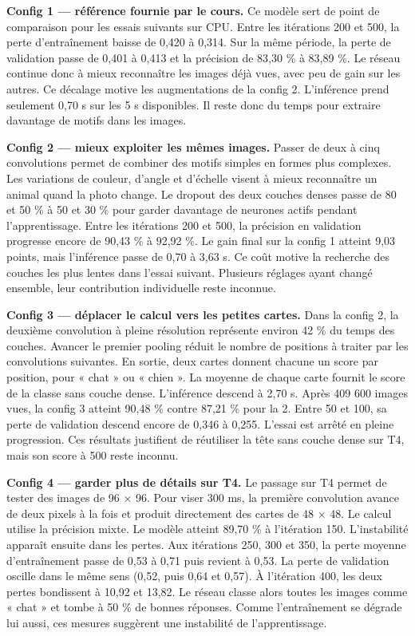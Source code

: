 \documentclass[10pt,a4paper]{article}
\begin{document}
\textbf{Config 1 — référence fournie par le cours.} Ce modèle sert de point de comparaison pour les essais suivants sur CPU. Entre les itérations 200 et 500, la perte d’entraînement baisse de 0,420 à 0,314. Sur la même période, la perte de validation passe de 0,401 à 0,413 et la précision de 83,30 \% à 83,89 \%. Le réseau continue donc à mieux reconnaître les images déjà vues, avec peu de gain sur les autres. Ce décalage motive les augmentations de la config 2. L’inférence prend seulement 0,70 s sur les 5 s disponibles. Il reste donc du temps pour extraire davantage de motifs dans les images.

\textbf{Config 2 — mieux exploiter les mêmes images.} Passer de deux à cinq convolutions permet de combiner des motifs simples en formes plus complexes. Les variations de couleur, d’angle et d’échelle visent à mieux reconnaître un animal quand la photo change. Le dropout des deux couches denses passe de 80 et 50 \% à 50 et 30 \% pour garder davantage de neurones actifs pendant l’apprentissage. Entre les itérations 200 et 500, la précision en validation progresse encore de 90,43 \% à 92,92 \%. Le gain final sur la config 1 atteint 9,03 points, mais l’inférence passe de 0,70 à 3,63 s. Ce coût motive la recherche des couches les plus lentes dans l’essai suivant. Plusieurs réglages ayant changé ensemble, leur contribution individuelle reste inconnue.

\textbf{Config 3 — déplacer le calcul vers les petites cartes.} Dans la config 2, la deuxième convolution à pleine résolution représente environ 42 \% du temps des couches. Avancer le premier pooling réduit le nombre de positions à traiter par les convolutions suivantes. En sortie, deux cartes donnent chacune un score par position, pour « chat » ou « chien ». La moyenne de chaque carte fournit le score de la classe sans couche dense. L’inférence descend à 2,70 s. Après 409 600 images vues, la config 3 atteint 90,48 \% contre 87,21 \% pour la 2. Entre 50 et 100, sa perte de validation descend encore de 0,346 à 0,255. L’essai est arrêté en pleine progression. Ces résultats justifient de réutiliser la tête sans couche dense sur T4, mais son score à 500 reste inconnu.

\textbf{Config 4 — garder plus de détails sur T4.} Le passage sur T4 permet de tester des images de 96 × 96. Pour viser 300 ms, la première convolution avance de deux pixels à la fois et produit directement des cartes de 48 × 48. Le calcul utilise la précision mixte. Le modèle atteint 89,70 \% à l’itération 150. L’instabilité apparaît ensuite dans les pertes. Aux itérations 250, 300 et 350, la perte moyenne d’entraînement passe de 0,53 à 0,71 puis revient à 0,53. La perte de validation oscille dans le même sens (0,52, puis 0,64 et 0,57). À l’itération 400, les deux pertes bondissent à 10,92 et 13,82. Le réseau classe alors toutes les images comme « chat » et tombe à 50 \% de bonnes réponses. Comme l’entraînement se dégrade lui aussi, ces mesures suggèrent une instabilité de l’apprentissage.
\end{document}
